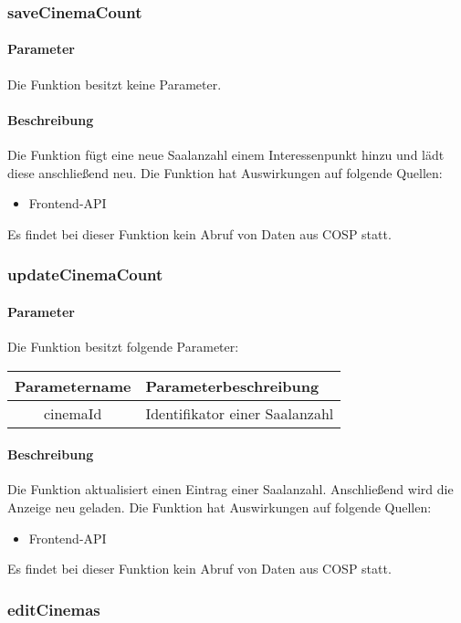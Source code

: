 \subsubsection{saveCinemaCount}
\paragraph{Parameter} Die Funktion besitzt keine Parameter.
\paragraph{Beschreibung} Die Funktion fügt eine neue Saalanzahl einem Interessenpunkt hinzu und lädt diese anschließend neu. Die Funktion hat Auswirkungen auf folgende Quellen:
\begin{itemize}
	\item Frontend-API
\end{itemize}
Es findet bei dieser Funktion kein Abruf von Daten aus {\glqq COSP\grqq} statt.
\subsubsection{updateCinemaCount}
\paragraph{Parameter} Die Funktion besitzt folgende Parameter:
\begin{table}[H]
	\begin{tabular}{|c|p{11cm}|}
		\hline
		\textbf{Parametername} & \textbf{Parameterbeschreibung} \\ \hline
		cinemaId & Identifikator einer Saalanzahl \\ \hline
	\end{tabular}
\end{table}
\paragraph{Beschreibung} Die Funktion aktualisiert einen Eintrag einer Saalanzahl. Anschließend wird die Anzeige neu geladen. Die Funktion hat Auswirkungen auf folgende Quellen:
\begin{itemize}
	\item Frontend-API
\end{itemize}
Es findet bei dieser Funktion kein Abruf von Daten aus {\glqq COSP\grqq} statt.
\subsubsection{editCinemas}

